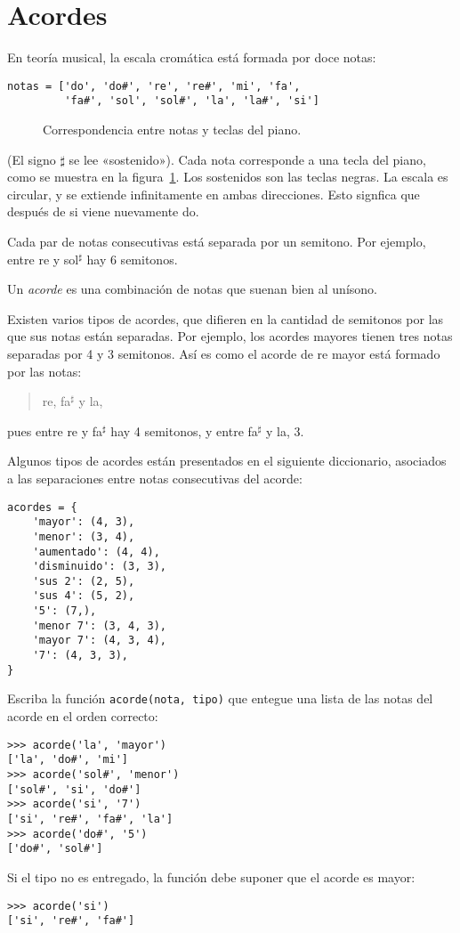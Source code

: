 \section{Acordes}

En teoría musical, la escala cromática está formada por doce notas:
\begin{lstlisting}
notas = ['do', 'do#', 're', 're#', 'mi', 'fa',
         'fa#', 'sol', 'sol#', 'la', 'la#', 'si']
\end{lstlisting}
%
\begin{figure}
  \centering
  
  \caption{Correspondencia entre notas y teclas del piano.}
  \label{fig:piano}
\end{figure}
%
(El signo \(\sharp\) se lee «sostenido»).
Cada nota corresponde a una tecla del piano,
como se muestra en la figura~\ref{fig:piano}.
Los sostenidos son las teclas negras.
La escala es circular, y se extiende infinitamente en ambas direcciones.
Esto signfica que después de si viene nuevamente do.

Cada par de notas consecutivas está separada por un semitono. Por
ejemplo, entre re y sol\({}^\sharp\) hay 6 semitonos.

Un \emph{acorde} es una combinación
de notas que suenan bien al unísono.

Existen varios tipos de acordes, que difieren en la cantidad de
semitonos por las que sus notas están separadas.
Por ejemplo, los acordes mayores tienen tres notas separadas por 4 y 3
semitonos. Así es como el acorde de re mayor está formado por las notas:
\begin{quote}
re, fa\({}^\sharp\) y la,
\end{quote}
pues entre re y fa\({}^\sharp\) hay 4 semitonos,
y entre fa\({}^\sharp\) y la, 3.

Algunos tipos de acordes están presentados en el siguiente diccionario,
asociados a las separaciones entre notas consecutivas del acorde:

\begin{lstlisting}
acordes = {
    'mayor': (4, 3),
    'menor': (3, 4),
    'aumentado': (4, 4),
    'disminuido': (3, 3),
    'sus 2': (2, 5),
    'sus 4': (5, 2),
    '5': (7,),
    'menor 7': (3, 4, 3),
    'mayor 7': (4, 3, 4),
    '7': (4, 3, 3),
}
\end{lstlisting}

Escriba la función \lstinline!acorde(nota, tipo)! que entegue una lista
de las notas del acorde en el orden correcto:

\begin{lstlisting}
>>> acorde('la', 'mayor')
['la', 'do#', 'mi']
>>> acorde('sol#', 'menor')
['sol#', 'si', 'do#']
>>> acorde('si', '7')
['si', 're#', 'fa#', 'la']
>>> acorde('do#', '5')
['do#', 'sol#']
\end{lstlisting}

Si el tipo no es entregado, la función debe suponer que el acorde es
mayor:
\begin{lstlisting}
>>> acorde('si')
['si', 're#', 'fa#']
\end{lstlisting}

